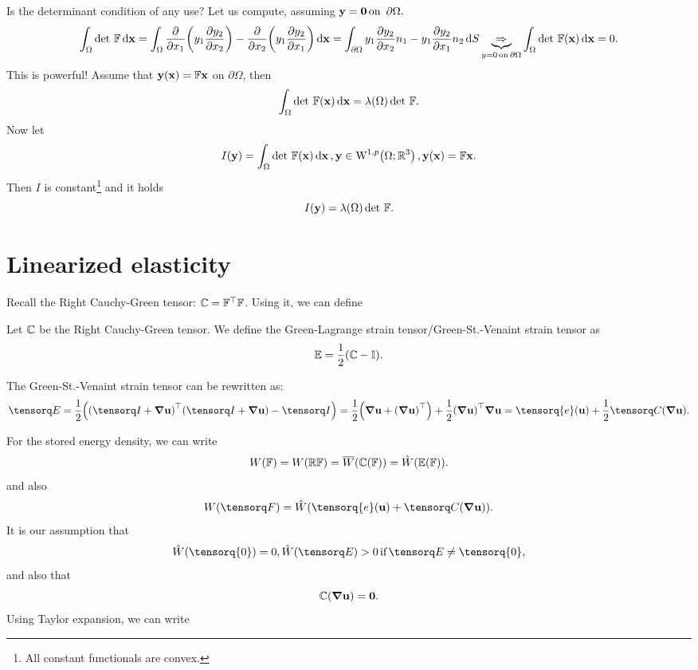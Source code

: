 \documentclass[reqno, a4paper]{article}
\begin{document}
Is the determinant condition of any use? Let us compute, assuming $\vb{y}= \vb{0} \, \text{on } \, \partial \Omega.$
\[
	\int_{\Omega}\det\, \mathbb{F}\dd{\vb{x}} = \int_{\Omega}\pdv{x_1}\qty(y_1 \pdv{y_2}{x_{2}})-\pdv{x_2}\qty(y_1 \pdv{y_2}{x_1})\dd{\vb{x}} = \int_{\partial \Omega}y_1 \pdv{y_2}{x_2}n_1 - y_1 \pdv{y_2}{x_1} n_2\dd{S} \underbrace{\Rightarrow}_{y=0 \, \text{on} \, \partial \Omega} \int_{\Omega}\det\, \mathbb{F}\qty(\vb{x})\dd{\vb{x}} = 0.
\]
This is powerful! Assume that $\vb{y}\qty(\vb{x}) = \mathbb{F} \vb{x}$ on $\partial \Omega$, then
\[
	\int_{\Omega}\det\, \mathbb{F}\qty(\vb{x})\dd{\vb{x}} = \lambda\qty(\Omega)\det\, \mathbb{F}.
\]
Now let
\[
	I\qty(\vb{y}) = \int_{\Omega}\detf\qty(\vb{x})\dd{\vb{x}}, \vb{y}\in \WkpSet[1][p]{\Omega; \R^3}, \vb{y}\qty(\vb{x}) = \fgrad \vb{x}.
\]
Then $I$ is constant\footnote{All constant functionals are convex.} and it holds
\[
	I\qty(\vb{y}) = \lambda\qty(\Omega)\det\, \mathbb{F}.
\]

\section{Linearized elasticity}
\label{sec:linearized_elasticity}

Recall the Right Cauchy-Green tensor: $\mathbb{C} = \mathbb{F}^\top\mathbb{F}$. Using it, we can define

\begin{theorem}
    Let $\mathbb{C}$ be the Right Cauchy-Green tensor. We define the Green-Lagrange strain tensor/Green-St.-Venaint strain tensor as
    \[
	    \mathbb{E} = \frac{1}{2}\qty(\mathbb{C} - \mathbb{I}).
    \]
\end{theorem}
\begin{remark}
    The Green-St.-Venaint strain tensor can be rewritten as:
    \[
	    \gsv = \frac{1}{2}\qty(\transpose{\qty(\identity+\grad \vb{u})}\qty(\identity + \grad \vb{u})- \identity) = \frac{1}{2}\qty(\grad \vb{u}+\transpose{\qty(\grad \vb{u})})+ \frac{1}{2}\transpose{\qty(\grad \vb{u})}\grad \vb{u} = \tensorq{e}\qty(\vb{u}) + \frac{1}{2}\rcg\qty(\grad \vb{u}).
    \]
\end{remark}
For the stored energy density, we can write
\[
	W\qty(\mathbb{F}) = W\qty(\mathbb{R}\mathbb{F}) = \overline{W}\qty(\mathbb{C}\qty(\mathbb{F})) = \hat{W}\qty(\mathbb{E}\qty(\mathbb{F})).
\]
and also
\[
	W\qty(\fgrad) = \hat{W}\qty(\tensorq{e}\qty(\vb{u})+\rcg\qty(\grad \vb{u})).
\]
It is our assumption that
\[
	\hat{W}\qty(\tensorq{0}) = 0, \hat{W}\qty(\gsv)>0 \, \text{if} \, \gsv \neq \tensorq{0},
\]
and also that
\[
	\mathbb{C}\qty(\grad \vb{u}) = \vb{0}.
\]
Using Taylor expansion, we can write
\end{document}
